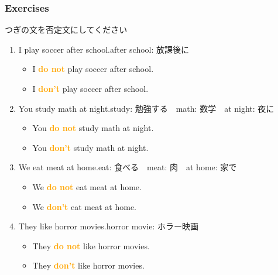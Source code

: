 \documentclass[aspectratio=169,xcolor={dvipsnames,table}]{beamer}
\newcommand{\myaudio}[1]{\href{#1}{\faVolumeUp}}
\begin{document}
\begin{frame}[plain]\frametitle{Exercises}
 
つぎの文を否定文にしてください
\begin{enumerate}
 \item I play soccer after school.\pause{}\hfill{\scriptsize after school: 放課後に}\pause
         \begin{itemize}
	 \item I \textcolor{orange}{\bfseries do not} play soccer after school.\\\pause
	  \item I \textcolor{orange}{\bfseries don't} play soccer after school.\pause
	\end{itemize}
 \item You study math at night.\pause\hfill{\scriptsize study: 勉強する　math: 数学　at night: 夜に}\\\pause
       \begin{itemize}
	\item You \textcolor{orange}{\bfseries do not} study math at night.\\\pause
	\item You \textcolor{orange}{\bfseries don't} study math at night.\pause
       \end{itemize}
 \item We eat meat at home.\pause\hfill{\scriptsize eat: 食べる　meat: 肉　at home: 家で}\\\pause
\begin{itemize}
 \item We \textcolor{orange}{\bfseries do not} eat meat at home.\\\pause
 \item We \textcolor{orange}{\bfseries don't} eat meat at home.\pause
\end{itemize}
 \item They like horror movies.\pause\hfill{\scriptsize horror movie: ホラー映画}\\\pause
\begin{itemize}
 \item They \textcolor{orange}{\bfseries do not} like horror movies.\\\pause
 \item They \textcolor{orange}{\bfseries don't} like horror movies.
\end{itemize}
\end{enumerate}

\myaudio{audio/007_negative_do_01.mp3}

\end{frame}
\end{document}
